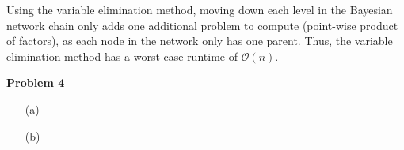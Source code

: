 \documentclass[11pt]{article}
\begin{document}
\begin{enumerate}
        Using the variable elimination method, moving down each level in the Bayesian network
        chain only adds one additional problem to compute (point-wise product of factors), as each node in the
        network only has one parent.
        Thus, the variable elimination method has a worst case
        runtime of $\mathcal{O}(n)$.
    \end{enumerate}

    \begin{center}
        \Large
        \textbf{Problem 4}
    \end{center}
    \normalsize
    \begin{enumerate}
        \item[(a)]
        \item[(b)]
    \end{enumerate}
\end{document}
